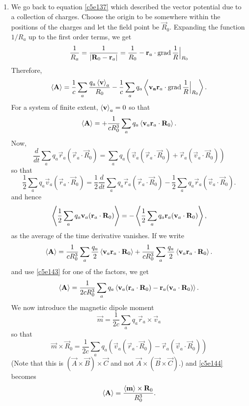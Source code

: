 \begin{enumerate}
\item We go back to equation \eqref{c5e137} which described the vector potential
due to a collection of charges. Choose the origin to be somewhere within the
positions of the charges and let the field point be $\vec{R}_0$. Expanding the
function $1/R_a$ up to the first order terms, we get
\[
\frac{1}{R_a} = \frac{1}{|\mathbf{R}_0 - \mathbf{r}_a|} = 
\frac{1}{R_0} - \mathbf{r}_a\cdot\operatorname{grad}\frac{1}{R}\Big|_{R_0}
\]
Therefore,
\begin{equation}\label{c5e141}
\left\langle{\mathbf{A}}\right\rangle = \frac{1}{c}\sum_a\frac{q_a\left\langle{\mathbf{v}}\right\rangle_a}{R_0} - 
\frac{1}{c}\sum_aq_a\left\langle{\mathbf{v_a}\mathbf{r}_a\cdot\operatorname{grad}\frac{1}{R}\Big|_{R_0}}\right\rangle.
\end{equation}
For a system of finite extent, $\left\langle{\mathbf{v}}\right\rangle_a = 0$ so that
\begin{equation}\label{c5e142}
\left\langle{\mathbf{A}}\right\rangle = +\frac{1}{cR_0^3}\sum_aq_a\left\langle{\mathbf{v}_a\mathbf{r}_a\cdot\mathbf{R}_0}\right\rangle.
\end{equation}
Now,
\[
\frac{d}{dt}\sum_a q_a\vec{r}_a(\vec{r}_a\cdot\vec{R}_0) = 
\sum_a q_a\left(\vec{v}_a(\vec{r}_a\cdot\vec{R}_0) + \vec{r}_a(\vec{v}_a\cdot\vec{R}_0)\right)
\]
so that
\[
\frac{1}{2}\sum_a q_a \vec{v}_a(\vec{r}_a\cdot\vec{R}_0) = 
\frac{1}{2}\frac{d}{dt}\sum_a q_a\vec{r}_a(\vec{r}_a\cdot\vec{R}_0) - 
\frac{1}{2}\sum_a q_a \vec{r}_a(\vec{v}_a\cdot\vec{R}_0).
\]
and hence
\begin{equation}\label{c5e143}
\left\langle{\frac{1}{2}\sum_a q_a \mathbf{v}_a(\mathbf{r}_a\cdot\mathbf{R}_0)}\right\rangle = 
-\left\langle{\frac{1}{2}\sum_a q_a \mathbf{r}_a(\mathbf{v}_a\cdot\mathbf{R}_0)}\right\rangle,
\end{equation}
as the average of the time derivative vanishes. If we write
\[
\left\langle{\mathbf{A}}\right\rangle = \frac{1}{cR_0^3}\sum_a\frac{q_a}{2}\left\langle{\mathbf{v}_a\mathbf{r}_a\cdot\mathbf{R}_0}\right\rangle
 + \frac{1}{cR_0^3}\sum_a\frac{q_a}{2}\left\langle{\mathbf{v}_a\mathbf{r}_a\cdot\mathbf{R}_0}\right\rangle.
\]
and use \eqref{c5e143} for one of the factors, we get
\begin{equation}\label{c5e144}
\left\langle{\mathbf{A}}\right\rangle = \frac{1}{2cR_0^3}\sum_aq_a\left\langle{\mathbf{v}_a(\mathbf{r}_a\cdot\mathbf{R}_0) - 
\mathbf{r}_a(\mathbf{v}_a\cdot\mathbf{R}_0)}\right\rangle.
\end{equation}
We now introduce the magnetic dipole moment
\begin{equation}\label{c5e145}
\vec{m} = \frac{1}{2c}\sum_a q_a\vec{r}_a \times \vec{v}_a
\end{equation}
so that
\[
\vec{m} \times \vec{R}_0 = \frac{1}{2c}
\sum_a q_a(\vec{v}_a(\vec{r}_a\cdot\vec{R}_0) - \vec{r}_a(\vec{v}_a\cdot\vec{R}_0))
\]
(Note that this is $(\vec{A} \times \vec{B})\times\vec{C}$ and not $\vec{A}\times
(\vec{B}\times\vec{C})$.) and \eqref{c5e144} becomes
\begin{equation}\label{c5e146}
\left\langle{\mathbf{A}}\right\rangle = \frac{\left\langle{\mathbf{m}}\right\rangle \times \mathbf{R}_0}{R_0^3}.
\end{equation}

\end{enumerate}


